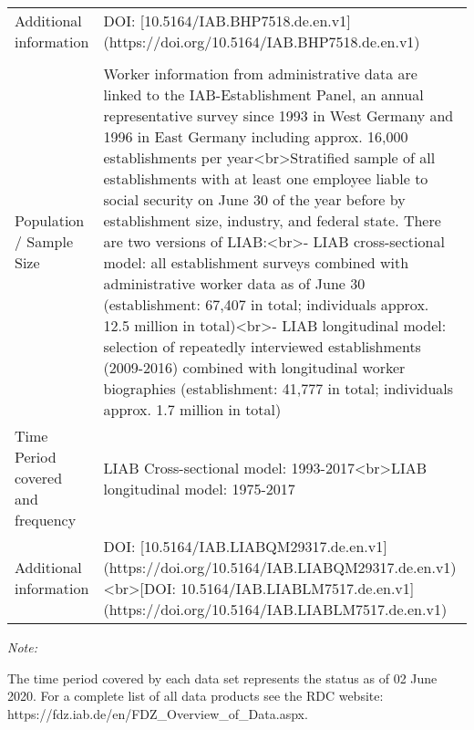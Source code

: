 \begin{table}
{\begin{threeparttable}
\begin{tabular}[t]{>{\raggedright\arraybackslash}p{10em}>{\raggedright\arraybackslash}p{25em}}
\hspace{1em}\begin{minipage}[t]{2.5cm}\raggedright\setstretch{0.8}Additional information\end{minipage} & DOI: [10.5164/IAB.BHP7518.de.en.v1](https://doi.org/10.5164/IAB.BHP7518.de.en.v1)\\
\addlinespace[0.3em]
\multicolumn{2}{l}{\textbf{Linked Employer-Employee Data (LIAB)}}\\
\hspace{1em}\begin{minipage}[t]{2.5cm}\raggedright\setstretch{0.8}Population / Sample Size\end{minipage} & Worker information from administrative data are linked to the IAB-Establishment Panel, an annual representative survey since 1993 in West Germany and 1996 in East Germany including approx. 16,000 establishments per year<br>\newline     Stratified sample of all establishments with at least one employee liable to social security on June 30 of the year before by establishment size, industry, and federal state. There are two versions of LIAB:<br>- LIAB cross-sectional model: all establishment surveys combined with administrative worker data as of June 30 (establishment: 67,407 in total; individuals approx. 12.5 million in total)<br>- LIAB longitudinal model: selection of repeatedly interviewed establishments (2009-2016) combined with longitudinal worker biographies (establishment: 41,777 in total; individuals approx. 1.7 million in total)\\
\hspace{1em}\begin{minipage}[t]{2.5cm}\raggedright\setstretch{0.8}Time Period covered and frequency\end{minipage} & LIAB Cross-sectional model: 1993-2017<br>LIAB longitudinal model: 1975-2017\\
\hspace{1em}\begin{minipage}[t]{2.5cm}\raggedright\setstretch{0.8}Additional information\end{minipage} & DOI: [10.5164/IAB.LIABQM29317.de.en.v1](https://doi.org/10.5164/IAB.LIABQM29317.de.en.v1)<br>[DOI: 10.5164/IAB.LIABLM7517.de.en.v1](https://doi.org/10.5164/IAB.LIABLM7517.de.en.v1)\\
\bottomrule
\end{tabular}
\begin{tablenotes}
\item \textit{Note: } 
\item The time period covered by each data set represents the status as of 02 June 2020. For a complete list of all data products see the RDC website: https://fdz.iab.de/en/FDZ\_Overview\_of\_Data.aspx.
\end{tablenotes}
\end{threeparttable}}
\end{table}